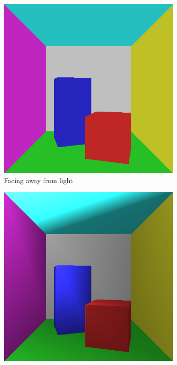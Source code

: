 \documentclass[a4paper,11pt]{article}
\begin{document}
\begin{figure}[h!]
	\centering
	\begin{subfigure}[h]{0.3\linewidth}
		\centering
		\includegraphics[width=\linewidth]{screenshot2.png}
		\caption{Facing away from light}
		\label{fig2}
	\end{subfigure}
	\begin{subfigure}[h!]{0.3\linewidth}
		\centering
		\includegraphics[width=\linewidth]{screenshot3.png}

\end{subfigure}
\end{figure}
\end{document}
